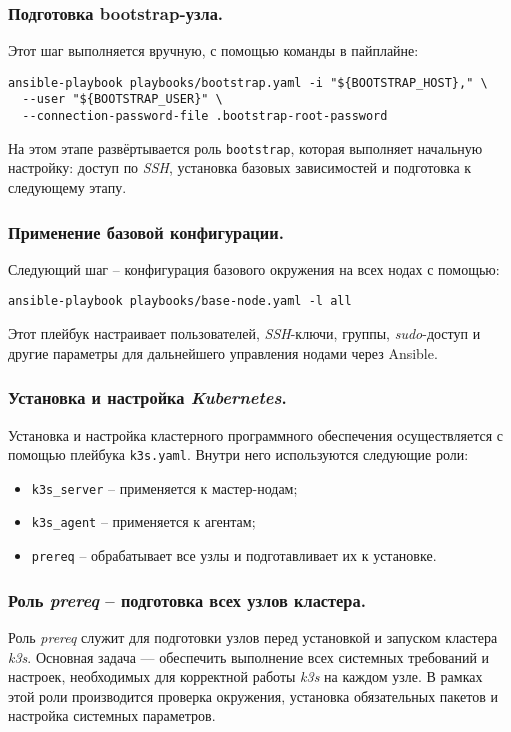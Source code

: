 \subsubsection{Подготовка bootstrap-узла.} Этот шаг выполняется вручную, с помощью команды в пайплайне:

\begin{lstlisting}
ansible-playbook playbooks/bootstrap.yaml -i "${BOOTSTRAP_HOST}," \
  --user "${BOOTSTRAP_USER}" \
  --connection-password-file .bootstrap-root-password
\end{lstlisting}

На этом этапе развёртывается роль \lstinline{bootstrap}, которая выполняет начальную настройку: доступ по \textit{SSH}, установка базовых зависимостей и подготовка к следующему этапу.

\subsubsection{Применение базовой конфигурации.} Следующий шаг -- конфигурация базового окружения на всех нодах с помощью:

\begin{lstlisting}
ansible-playbook playbooks/base-node.yaml -l all
\end{lstlisting}

Этот плейбук настраивает пользователей, \textit{SSH}-ключи, группы, \textit{sudo}-доступ и другие параметры для дальнейшего управления нодами через Ansible.

\subsubsection{Установка и настройка \textit{Kubernetes}.} Установка и настройка кластерного программного обеспечения\cite{k3s} осуществляется с помощью плейбука \lstinline{k3s.yaml}. Внутри него используются следующие роли:

\begin{itemize}
  \item \lstinline{k3s_server} -- применяется к мастер-нодам;
  \item \lstinline{k3s_agent} -- применяется к агентам;
  \item \lstinline{prereq} -- обрабатывает все узлы и подготавливает их к установке.
\end{itemize}

\subsubsection{Роль \textit{prereq} -- подготовка всех узлов кластера.}
Роль \textit{prereq} служит для подготовки узлов перед установкой и запуском кластера \textit{k3s}. Основная задача — обеспечить выполнение всех системных требований и настроек, необходимых для корректной работы \textit{k3s} на каждом узле. В рамках этой роли производится проверка окружения, установка обязательных пакетов и настройка системных параметров.

